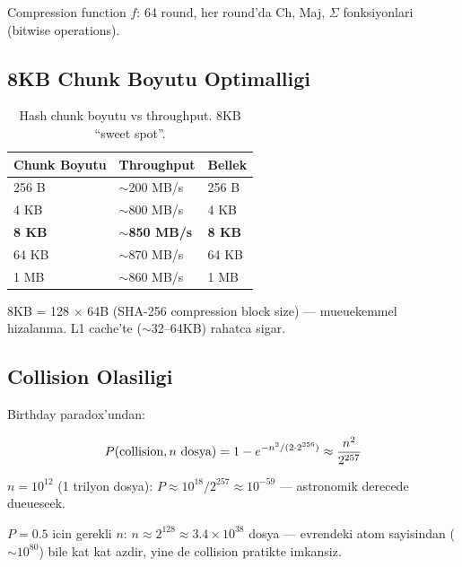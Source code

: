 Compression function $f$: 64 round, her round'da Ch, Maj, $\Sigma$ fonksiyonlari (bitwise operations).

\subsection{8KB Chunk Boyutu Optimalligi}

\begin{table}[ht]
\centering
\begin{tabular}{lll}
\toprule
\textbf{\color{sectioncyan}Chunk Boyutu} & \textbf{\color{sectioncyan}Throughput} & \textbf{\color{sectioncyan}Bellek} \\
\midrule
256 B & $\sim$200 MB/s & 256 B \\
4 KB & $\sim$800 MB/s & 4 KB \\
\textbf{8 KB} & $\sim$\textbf{850 MB/s} & \textbf{8 KB} \\
64 KB & $\sim$870 MB/s & 64 KB \\
1 MB & $\sim$860 MB/s & 1 MB \\
\bottomrule
\end{tabular}
\caption{Hash chunk boyutu vs throughput. 8KB ``sweet spot''.}
\end{table}

8KB = 128 $\times$ 64B (SHA-256 compression block size) --- mueuekemmel hizalanma. L1 cache'te ($\sim$32--64KB) rahatca sigar.

\subsection{Collision Olasiligi}

Birthday paradox'undan:

\begin{equation}
P\!\left(\text{collision}, n \text{ dosya}\right) = 1 - e^{-n^2 / (2 \cdot 2^{256})} \approx \frac{n^2}{2^{257}}
\end{equation}

$n = 10^{12}$ (1 trilyon dosya): $P \approx 10^{18} / 2^{257} \approx 10^{-59}$ --- astronomik derecede dueueseek.

$P = 0.5$ icin gerekli $n$: $n \approx 2^{128} \approx 3.4 \times 10^{38}$ dosya --- evrendeki atom sayisindan ($\sim 10^{80}$) bile kat kat azdir, yine de collision pratikte imkansiz.
